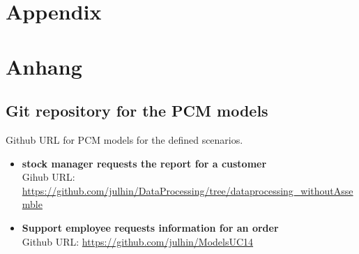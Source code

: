 

{\chapter{Appendix}}    %
{\chapter{Anhang}}      %
\label{chap:appendix}


\section{Git repository for the PCM models}
\label{sec:appendix:FirstSection}
Github URL for PCM models for the defined scenarios.
\begin{itemize}
\item \textbf{stock manager requests the report for a customer}\\
Gihub URL: \url{https://github.com/julhin/DataProcessing/tree/dataprocessing_withoutAssemble}
\item \textbf{Support employee requests information for an order}\\
Github URL: \url{https://github.com/julhin/ModelsUC14}
\end{itemize}
		
